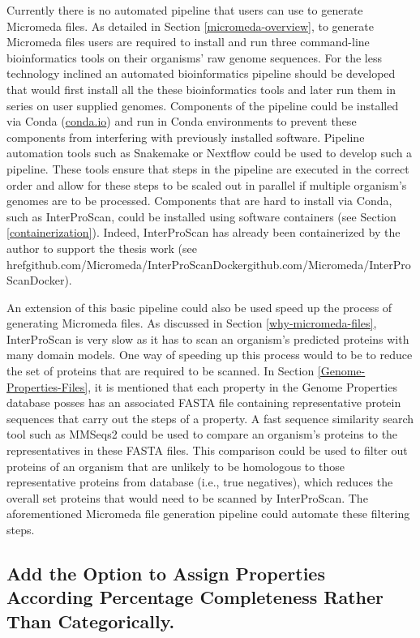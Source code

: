 Currently there is no automated pipeline that users can use to generate Micromeda files. As detailed in Section \ref{micromeda-overview}, to generate Micromeda files users are required to install and run three command-line bioinformatics tools on their organisms' raw genome sequences. For the less technology inclined an automated bioinformatics pipeline should be developed that would first install all the these bioinformatics tools and later run them in series on user supplied genomes. Components of the pipeline could be installed via Conda (\href{conda.io}{conda.io}) and run in Conda environments to prevent these components from interfering with previously installed software. Pipeline automation tools such as Snakemake \cite{koster2012snakemake} or Nextflow \cite{di2017nextflow} could be used to develop such a pipeline. These tools ensure that steps in the pipeline are executed in the correct order and allow for these steps to be scaled out in parallel if multiple organism's genomes are to be processed. Components that are hard to install via Conda, such as InterProScan, could be installed using software containers (see Section \ref{containerization}). Indeed, InterProScan has already been containerized by the author to support the thesis work (see href{github.com/Micromeda/InterProScan\-Docker}{github.com/Micromeda/InterProScan\-Docker}).

An extension of this basic pipeline could also be used speed up the process of generating Micromeda files. As discussed in Section \ref{why-micromeda-files}, InterProScan is very slow as it has to scan an organism's predicted proteins with many domain models. One way of speeding up this process would to be to reduce the set of proteins that are required to be scanned. In Section \ref{Genome-Properties-Files}, it is mentioned that each property in the Genome Properties database posses has an associated FASTA file containing representative protein sequences that carry out the steps of a property. A fast sequence similarity search tool such as MMSeqs2 \cite{steinegger2017mmseqs2} could be used to compare an organism's proteins to the representatives in these FASTA files. This comparison could be used to filter out proteins of an organism that are unlikely to be homologous to those representative proteins from database (i.e., true negatives), which reduces the overall set proteins that would need to be scanned by InterProScan. The aforementioned Micromeda file generation pipeline could automate these filtering steps.

\subsection{Add the Option to Assign Properties According Percentage Completeness Rather Than Categorically.}

